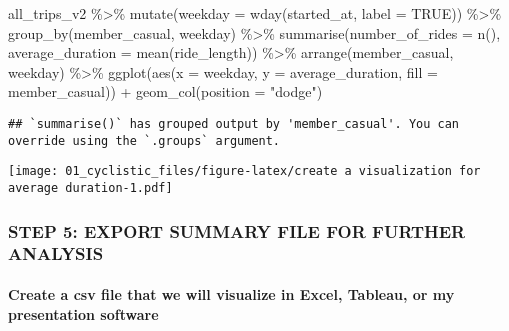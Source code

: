 \documentclass[
]{article}
\newenvironment{Shaded}{\begin{snugshade}}{\end{snugshade}}
\newcommand{\AttributeTok}[1]{\textcolor[rgb]{0.77,0.63,0.00}{#1}}
\newcommand{\ConstantTok}[1]{\textcolor[rgb]{0.00,0.00,0.00}{#1}}
\newcommand{\FunctionTok}[1]{\textcolor[rgb]{0.00,0.00,0.00}{#1}}
\newcommand{\NormalTok}[1]{#1}
\newcommand{\SpecialCharTok}[1]{\textcolor[rgb]{0.00,0.00,0.00}{#1}}
\newcommand{\StringTok}[1]{\textcolor[rgb]{0.31,0.60,0.02}{#1}}
\begin{document}
\begin{Shaded}
\begin{Highlighting}[]
\NormalTok{all\_trips\_v2 }\SpecialCharTok{\%\textgreater{}\%} 
  \FunctionTok{mutate}\NormalTok{(}\AttributeTok{weekday =} \FunctionTok{wday}\NormalTok{(started\_at, }\AttributeTok{label =} \ConstantTok{TRUE}\NormalTok{)) }\SpecialCharTok{\%\textgreater{}\%} 
  \FunctionTok{group\_by}\NormalTok{(member\_casual, weekday) }\SpecialCharTok{\%\textgreater{}\%} 
  \FunctionTok{summarise}\NormalTok{(}\AttributeTok{number\_of\_rides =} \FunctionTok{n}\NormalTok{(), }
            \AttributeTok{average\_duration =} \FunctionTok{mean}\NormalTok{(ride\_length)) }\SpecialCharTok{\%\textgreater{}\%}
  \FunctionTok{arrange}\NormalTok{(member\_casual, weekday) }\SpecialCharTok{\%\textgreater{}\%} 
  \FunctionTok{ggplot}\NormalTok{(}\FunctionTok{aes}\NormalTok{(}\AttributeTok{x =}\NormalTok{ weekday, }\AttributeTok{y =}\NormalTok{ average\_duration, }
             \AttributeTok{fill =}\NormalTok{ member\_casual)) }\SpecialCharTok{+}
  \FunctionTok{geom\_col}\NormalTok{(}\AttributeTok{position =} \StringTok{"dodge"}\NormalTok{)}
\end{Highlighting}
\end{Shaded}

\begin{verbatim}
## `summarise()` has grouped output by 'member_casual'. You can override using the `.groups` argument.
\end{verbatim}

\texttt{[image: 01\_cyclistic\_files/figure-latex/create a visualization for average duration-1.pdf]}

\hypertarget{step-5-export-summary-file-for-further-analysis}{%
\subsubsection{STEP 5: EXPORT SUMMARY FILE FOR FURTHER
ANALYSIS}\label{step-5-export-summary-file-for-further-analysis}}

\hypertarget{create-a-csv-file-that-we-will-visualize-in-excel-tableau-or-my-presentation-software}{%
\paragraph{Create a csv file that we will visualize in Excel, Tableau,
or my presentation
software}\label{create-a-csv-file-that-we-will-visualize-in-excel-tableau-or-my-presentation-software}}
\end{document}
